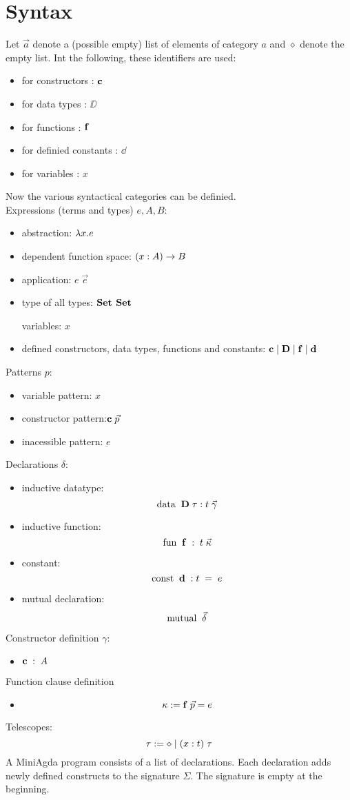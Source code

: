 \section{Syntax}
Let $\vec{a}$ denote a (possible empty) list of elements of category $a$
and $\diamond$ denote the empty list.
Int the following, these identifiers are used:
\begin{itemize}
\item for constructors : $\mathbf{c}$ 
\item for data types : $\DD$
\item for functions : $\mathbf{f}$
\item for definied constants : $\dd$
\item for variables : $x$
\end{itemize}
Now the various syntactical categories can be definied.
\\
Expressions (terms and types) $e,A,B$:  
\begin{itemize}
\item
abstraction: $ \lambda x . e $ 
\item
dependent function space: $( x : A ) \rightarrow B$ 
\item 
application: $ e \; \vec{e} $ 
\item
type of all types: $ \mathbf{Set} $  $ \mathbf{Set} $ 

variables: $x$
\item
defined constructors, data types, functions and constants:
$ \mathbf{c} \;\vert\; \mathbf{D} \;\vert\; \mathbf{f} \;\vert\; \mathbf{d}$
\end{itemize}
Patterns $p$:
\begin{itemize}
\item
variable pattern: $x$ 
\item
constructor pattern:$ \mathbf{c} \; \vec{p} $ 
\item
inacessible pattern: $ \underbar{e} $ 
\end{itemize}
Declarations $\delta$:
\begin{itemize}
\item
inductive datatype: 
\[\mathrm{data}\; \; \mathbf{D} \; \tau : t \; \vec{\gamma}\]  
\item
inductive function:
\[\mathrm{fun}\; \; \mathbf{f} \; : \; t \; \vec{\kappa}\]
\item
constant:
\[\mathrm{const}\; \;  \mathbf{d} \; : t \; = \; e \]
\item
mutual declaration:
\[\mathrm{mutual}\; \; \vec{\delta}\]
\end{itemize}
Constructor definition $\gamma$:
\begin{itemize}
\item
$ \mathbf{c} \; : \; A $ 
\end{itemize}
Function clause definition
\begin{itemize}
\item
\[ \kappa :=  \mathbf{f} \; \vec{p} = e \]
\end{itemize}
Telescopes:
\[ \tau := \diamond \;\vert\; ( x : t ) \; \tau \]
A MiniAgda program consists of a list of declarations.
Each declaration adds newly defined constructs to the signature $\Sigma$.
The signature is empty at the beginning.
